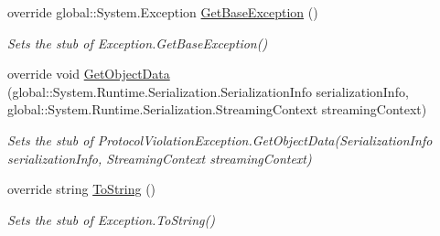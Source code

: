 \begin{DoxyCompactItemize}
override global\-::\-System.\-Exception \hyperlink{class_system_1_1_net_1_1_fakes_1_1_stub_protocol_violation_exception_a9ca86b61fac9c830c2136a02c628d6f6}{Get\-Base\-Exception} ()
\begin{DoxyCompactList}\small\item\em Sets the stub of Exception.\-Get\-Base\-Exception()\end{DoxyCompactList}\item 
override void \hyperlink{class_system_1_1_net_1_1_fakes_1_1_stub_protocol_violation_exception_a62bf9fa5596efd297eee0bcb8f52eb94}{Get\-Object\-Data} (global\-::\-System.\-Runtime.\-Serialization.\-Serialization\-Info serialization\-Info, global\-::\-System.\-Runtime.\-Serialization.\-Streaming\-Context streaming\-Context)
\begin{DoxyCompactList}\small\item\em Sets the stub of Protocol\-Violation\-Exception.\-Get\-Object\-Data(\-Serialization\-Info serialization\-Info, Streaming\-Context streaming\-Context)\end{DoxyCompactList}\item 
override string \hyperlink{class_system_1_1_net_1_1_fakes_1_1_stub_protocol_violation_exception_aed93cef56be22b6f671204eca9ae7f88}{To\-String} ()
\begin{DoxyCompactList}\small\item\em Sets the stub of Exception.\-To\-String()\end{DoxyCompactList}\end{DoxyCompactItemize}
